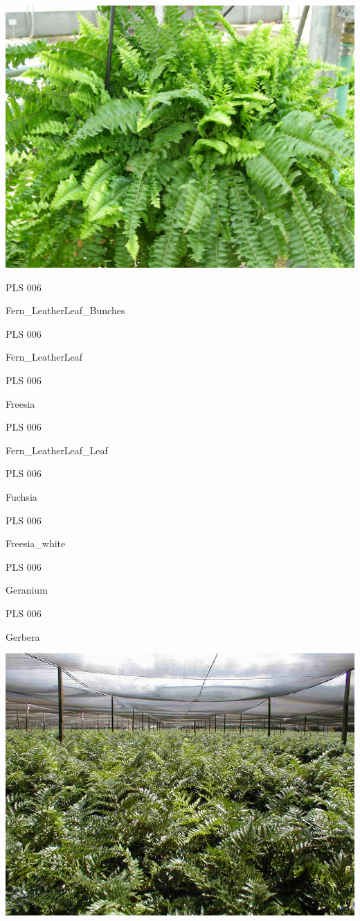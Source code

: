 \documentclass{article}
\begin{document}
\begin{center}
\includegraphics[height=0.925\paperheight]{../Fern_Boston.jpg}
\end{center}
\newpage

\noindent  PLS 006
\vfill
\centerline{{\huge Fern\_LeatherLeaf\_Bunches }}
\vfill
\newpage

\noindent  PLS 006
\vfill
\centerline{{\huge Fern\_LeatherLeaf }}
\vfill
\newpage

\noindent  PLS 006
\vfill
\centerline{{\huge Freesia }}
\vfill
\newpage

\noindent  PLS 006
\vfill
\centerline{{\huge Fern\_LeatherLeaf\_Leaf }}
\vfill
\newpage

\noindent  PLS 006
\vfill
\centerline{{\huge Fuchsia }}
\vfill
\newpage

\noindent  PLS 006
\vfill
\centerline{{\huge Freesia\_white }}
\vfill
\newpage

\noindent  PLS 006
\vfill
\centerline{{\huge Geranium }}
\vfill
\newpage

\noindent  PLS 006
\vfill
\centerline{{\huge Gerbera }}
\vfill
\newpage

\begin{center}
\includegraphics[height=0.925\paperheight]{../Fern_LeatherLeaf.jpg}
\end{center}
\newpage
\end{document}
